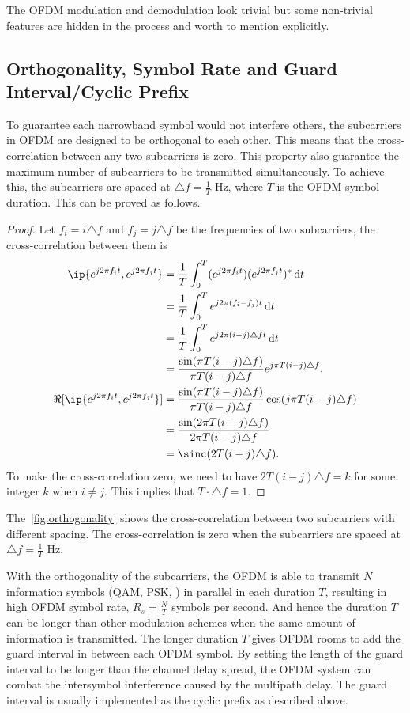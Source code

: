 The OFDM modulation and demodulation look trivial but some non-trivial features are hidden in the process and worth to mention explicitly.

\subsection{Orthogonality, Symbol Rate and Guard Interval/Cyclic Prefix}
To guarantee each narrowband symbol would not interfere others, the subcarriers in OFDM are designed to be orthogonal to each other. This means that the cross-correlation between any two subcarriers is zero. This property also guarantee the maximum number of subcarriers to be transmitted simultaneously. To achieve this, the subcarriers are spaced at $\triangle f=\frac{1}{T}$ Hz, where $T$ is the OFDM symbol duration. This can be proved as follows.
\begin{proof}
    Let $f_i=i\triangle f$ and $f_j=j\triangle f$ be the frequencies of two subcarriers, the cross-correlation between them is
    \begin{align*}
        \ip{e^{j2\pi f_i t}, e^{j2\pi f_j t}}
        &= \frac{1}{T}\int_{0}^{T} (e^{j2\pi f_i t}) (e^{j2\pi f_j t})^* \diff t \\
        &= \frac{1}{T}\int_{0}^{T} e^{j2\pi (f_i - f_j) t} \diff t \\
        &= \frac{1}{T}\int_{0}^{T} e^{j2\pi (i - j)\triangle f t} \diff t \\
        &= \frac{\sin(\pi T(i-j)\triangle f)}{\pi T(i-j)\triangle f}e^{j\pi T(i-j)\triangle f}. \\
        \Re[\ip{e^{j2\pi f_i t}, e^{j2\pi f_j t}}]
        &= \frac{\sin(\pi T(i-j)\triangle f)}{\pi T(i-j)\triangle f}\cos(j\pi T(i-j)\triangle f) \\
        &= \frac{\sin(2\pi T(i-j)\triangle f)}{2\pi T(i-j)\triangle f} \\
        &= \sinc(2T(i-j)\triangle f).
    \end{align*}
    To make the cross-correlation zero, we need to have $2T(i-j)\triangle f = k$ for some integer $k$ when $i\neq j$. This implies that $T\cdot\triangle f=1$.
\end{proof}
The~\cref{fig:orthogonality} shows the cross-correlation between two subcarriers with different spacing. The cross-correlation is zero when the subcarriers are spaced at $\triangle f=\frac{1}{T}$ Hz.

With the orthogonality of the subcarriers, the OFDM is able to transmit $N$ information symbols (\ie QAM, PSK, \etc) in parallel in each duration $T$, resulting in high OFDM symbol rate, $R_s=\frac{N}{T}$ symbols per second. And hence the duration $T$ can be longer than other modulation schemes when the same amount of information is transmitted.
The longer duration $T$ gives OFDM rooms to add the guard interval in between each OFDM symbol. By setting the length of the guard interval to be longer than the channel delay spread, the OFDM system can combat the intersymbol interference caused by the multipath delay. The guard interval is usually implemented as the cyclic prefix as described above.

